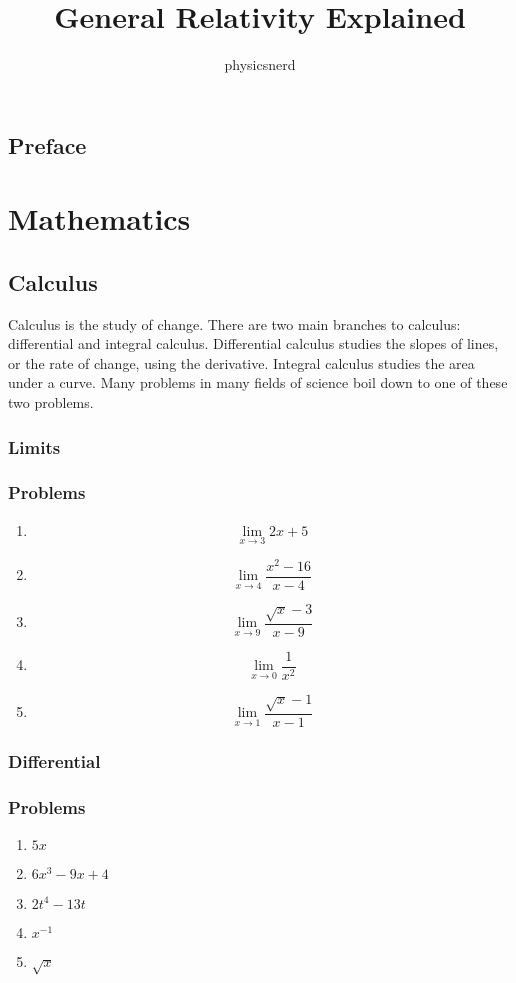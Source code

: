 \documentclass{memoir}
\title{General Relativity Explained}
\author{physicsnerd}
\begin{document}
\frontmatter
\maketitle
\tableofcontents
\chapter{Preface}

\mainmatter
\part{Mathematics}
\chapter{Calculus}
Calculus is the study of change. 
There are two main branches to calculus: differential and integral calculus. 
Differential calculus studies the slopes of lines, or the rate of change, using the derivative. 
Integral calculus studies the area under a curve. 
Many problems in many fields of science boil down to one of these two problems.
\section{Limits}


\section{Problems}
\begin{enumerate}
    \item $$\lim\limits_{x\rightarrow 3} 2x+5$$
    \item $$\lim\limits_{x\rightarrow 4} \frac{x^2-16}{x-4}$$
    \item $$\lim\limits_{x\rightarrow 9} \frac{\sqrt{x}-3}{x-9}$$
    \item $$\lim\limits_{x\rightarrow 0} \frac{1}{x^2}$$
    \item $$\lim\limits_{x\rightarrow 1} \frac{\sqrt{x}-1}{x-1}$$
\end{enumerate}

\section{Differential}


\section{Problems}
\begin{enumerate}
    \item $5x$
    \item $6x^3 - 9x + 4$
    \item $2t^4 - 13t$
    \item $x^{-1}$
    \item $\sqrt{x}$
\end{enumerate}
\end{document}
